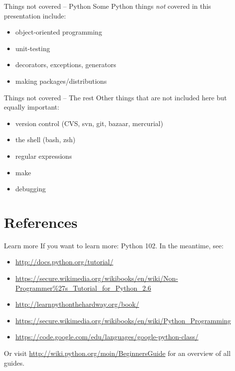 \documentclass[xetex,10pt]{beamer}
\def\spacer{\vspace*{1em}}
\begin{document}
\begin{frame}[fragile]{Things not covered -- Python}
	Some Python things \emph{not} covered in this presentation include:
	\spacer
	\begin{itemize}
		\item object-oriented programming
		\item unit-testing
		\item decorators, exceptions, generators
		\item making packages/distributions
	\end{itemize}
\end{frame}

\begin{frame}[fragile]{Things not covered -- The rest}
	Other things that are not included here but equally important:
	\spacer
	\begin{itemize}
		\item version control (CVS, svn, git, bazaar, mercurial)
		\item the shell (bash, zsh)
		\item regular expressions
		\item make
		\item debugging
	\end{itemize}
\end{frame}

\section*{References}

\begin{frame}{Learn more}
	If you want to learn more: Python 102.
	\spacer
	In the meantime, see:
	\begin{itemize}
		\item \url{http://docs.python.org/tutorial/}
		\item \url{https://secure.wikimedia.org/wikibooks/en/wiki/Non-Programmer\%27s_Tutorial_for_Python_2.6}
		\item \url{http://learnpythonthehardway.org/book/}
		\item \url{https://secure.wikimedia.org/wikibooks/en/wiki/Python_Programming}
		\item \url{https://code.google.com/edu/languages/google-python-class/}
	\end{itemize}
	
	Or visit \url{http://wiki.python.org/moin/BeginnersGuide} for an overview of all guides.
	
\end{frame}
\end{document}
